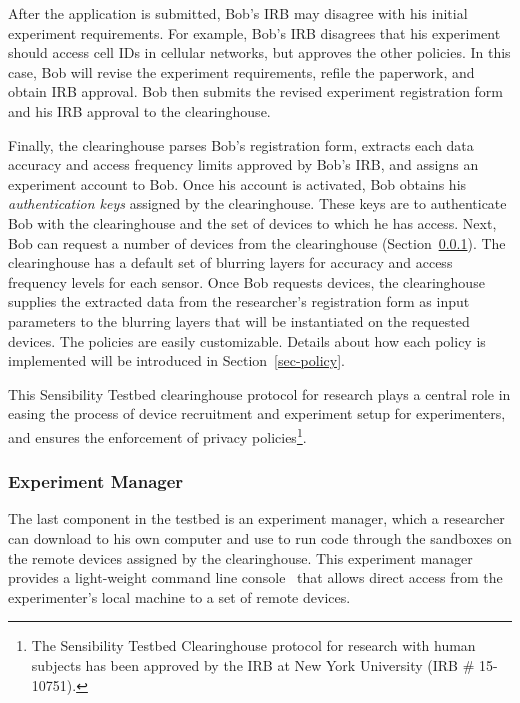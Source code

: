 After the application is submitted, Bob's IRB may disagree with 
his initial experiment requirements. For example, Bob's IRB disagrees 
that his experiment should access cell IDs in cellular networks, but 
approves the other policies. 
In this case, Bob will revise the experiment requirements, refile the paperwork, 
and obtain IRB approval. Bob then submits the revised experiment 
registration form and his IRB approval to the clearinghouse.

Finally, the clearinghouse
parses Bob's registration form, extracts each data accuracy and access 
frequency limits approved by Bob's IRB, and assigns an experiment 
account to Bob. Once his account is activated, Bob obtains his 
\textit{authentication keys} assigned by the 
clearinghouse. These keys are to authenticate Bob with the 
clearinghouse and the set of devices to which he has access.
Next, Bob can request a number of devices from the 
clearinghouse (Section~\ref{sec-emt}). The clearinghouse has a default set of blurring layers 
for accuracy and access frequency levels for each sensor. Once Bob requests 
devices, the clearinghouse supplies the extracted data from the 
researcher's registration form as input parameters to
the blurring layers that will be instantiated on the requested devices. 
The policies are easily customizable. Details about
how each policy is implemented will be introduced in Section~\ref{sec-policy}.


This Sensibility Testbed
clearinghouse protocol for research plays a central role in
easing the process of device recruitment and experiment setup for experimenters, 
and ensures the enforcement
of privacy policies\footnote{\scriptsize The Sensibility Testbed Clearinghouse
protocol for research with human subjects has been approved by
the IRB at New York University (IRB \# 15-10751).}. 


\subsubsection{Experiment Manager}\label{sec-emt}

The last component in the testbed is an experiment manager, which a researcher can download to
his own computer and use to run code through 
the sandboxes on the remote devices assigned by the clearinghouse. 
This experiment manager provides a light-weight command line 
console~\cite{demo-kit} that allows direct access from the 
experimenter's local machine to a set of remote devices. 

